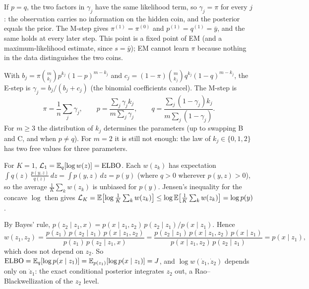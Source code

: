 If $p = q$, the two factors in $\gamma_j$ have the same likelihood term, so
$\gamma_j = \pi$ for every $j$: the observation carries no information on the hidden
coin, and the posterior equals the prior. The M-step gives $\pi^{(1)} = \pi^{(0)}$ and
$p^{(1)} = q^{(1)} = \bar y$, and the same holds at every later step. This point is a
fixed point of EM (and a maximum-likelihood estimate, since $s = \bar y$); EM cannot
learn $\pi$ because nothing in the data distinguishes the two coins.

With $b_j = \pi\binom m{k_j}p^{k_j}(1-p)^{m-k_j}$ and
$c_j = (1-\pi)\binom m{k_j}q^{k_j}(1-q)^{m-k_j}$, the E-step is $\gamma_j = b_j/(b_j + c_j)$
(the binomial coefficients cancel). The M-step is
\[
  \pi = \frac1n\sum_j\gamma_j,\qquad
  p = \frac{\sum_j\gamma_jk_j}{m\sum_j\gamma_j},\qquad
  q = \frac{\sum_j(1-\gamma_j)k_j}{m\sum_j(1-\gamma_j)} .
\]
For $m\geq3$ the distribution of $k_j$ determines the parameters (up to swapping B and C,
and when $p\neq q$). For $m = 2$ it is still not enough: the law of $k_j\in\{0,1,2\}$ has two
free values for three parameters.

For $K = 1$, $\mathcal L_1 = \mathbb{E}_q[\log w(z)] = \mathrm{ELBO}$. Each $w(z_k)$ has expectation
$\int q(z)\,\frac{p(y,z)}{q(z)}\,dz = \int p(y,z)\,dz = p(y)$ (where $q>0$ wherever
$p(y,z)>0$), so the average $\frac1K\sum_kw(z_k)$ is unbiased for $p(y)$. Jensen's
inequality for the concave $\log$ then gives
$\mathcal L_K = \mathbb{E}\bigl[\log\frac1K\sum_kw(z_k)\bigr]\leq\log\mathbb{E}\bigl[\frac1K\sum_kw(z_k)\bigr] = \log p(y)$.

By Bayes' rule, $p(z_2\mid z_1,x) = p(x\mid z_1,z_2)\,p(z_2\mid z_1)/p(x\mid z_1)$. Hence
\[
  w(z_1,z_2) = \frac{p(z_1)\,p(z_2\mid z_1)\,p(x\mid z_1,z_2)}{p(z_1)\,p(z_2\mid z_1,x)}
  = \frac{p(z_2\mid z_1)\,p(x\mid z_1,z_2)\,p(x\mid z_1)}{p(x\mid z_1,z_2)\,p(z_2\mid z_1)} = p(x\mid z_1),
\]
which does not depend on $z_2$. So $\mathrm{ELBO} = \mathbb{E}_q[\log p(x\mid z_1)] = \mathbb{E}_{p(z_1)}[\log p(x\mid z_1)] = J$,
and $\log w(\dot z_1,\dot z_2)$ depends only on $\dot z_1$: the exact conditional posterior
integrates $z_2$ out, a Rao--Blackwellization of the $z_2$ level.

\section{}

